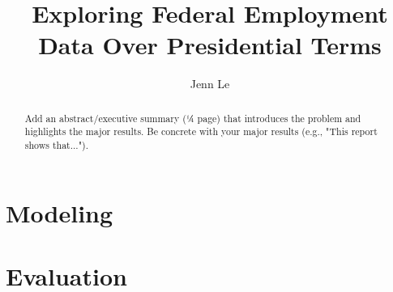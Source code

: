 \documentclass[12pt]{article}
\title{Exploring Federal Employment Data Over Presidential Terms}
\author{Jenn Le}
\begin{document}
  \maketitle

  \thispagestyle{empty}

  \begin{abstract}

    Add an abstract/executive summary (¼ page) that introduces the problem and
    highlights the major results. Be concrete with your major results (e.g., "This
    report shows that...").

  \end{abstract}

  \clearpage

  \tableofcontents
  \pagebreak

  \section{Modeling}

  \section{Evaluation}
\end{document}
